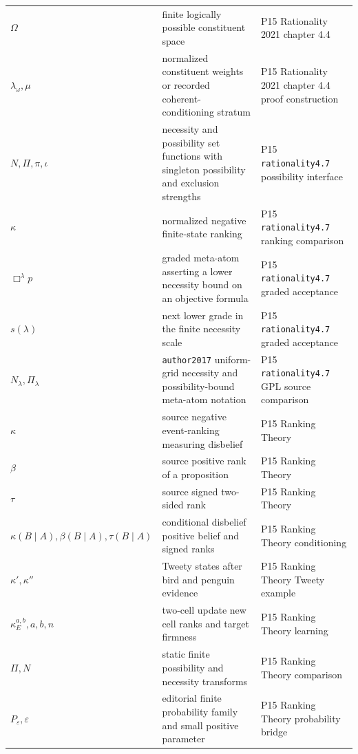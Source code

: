 \begin{longtable}{@{}p{}p{}p{}@{}}
\(\Omega\) & finite logically possible constituent space & P15 Rationality 2021 chapter 4.\allowbreak{}4 \\
\(\lambda_\omega,\allowbreak \mu\) & normalized constituent weights or recorded coherent-conditioning stratum & P15 Rationality 2021 chapter 4.\allowbreak{}4 proof construction \\
\(N,\allowbreak \Pi,\allowbreak \pi,\allowbreak \iota\) & necessity and possibility set functions with singleton possibility and exclusion strengths & P15 \texttt{rationality4.\allowbreak{}7} possibility interface \\
\(\kappa\) & normalized negative finite-state ranking & P15 \texttt{rationality4.\allowbreak{}7} ranking comparison \\
\(\Box^\lambda p\) & graded meta-atom asserting a lower necessity bound on an objective formula & P15 \texttt{rationality4.\allowbreak{}7} graded acceptance \\
\(s(\lambda)\) & next lower grade in the finite necessity scale & P15 \texttt{rationality4.\allowbreak{}7} graded acceptance \\
\(N_\lambda,\allowbreak \Pi_\lambda\) & \texttt{author2017} uniform-grid necessity and possibility-bound meta-atom notation & P15 \texttt{rationality4.\allowbreak{}7} GPL source comparison \\
\(\kappa\) & source negative event-ranking measuring disbelief & P15 Ranking Theory \\
\(\beta\) & source positive rank of a proposition & P15 Ranking Theory \\
\(\tau\) & source signed two-sided rank & P15 Ranking Theory \\
\(\kappa(B\mid A),\allowbreak \beta(B\mid A),\allowbreak \tau(B\mid A)\) & conditional disbelief positive belief and signed ranks & P15 Ranking Theory conditioning \\
\(\kappa',\allowbreak \kappa''\) & Tweety states after bird and penguin evidence & P15 Ranking Theory Tweety example \\
\(\kappa_E^{a,b},\allowbreak a,\allowbreak b,\allowbreak n\) & two-cell update new cell ranks and target firmness & P15 Ranking Theory learning \\
\(\Pi,\allowbreak N\) & static finite possibility and necessity transforms & P15 Ranking Theory comparison \\
\(P_\varepsilon,\allowbreak \varepsilon\) & editorial finite probability family and small positive parameter & P15 Ranking Theory probability bridge \\

\end{longtable}
